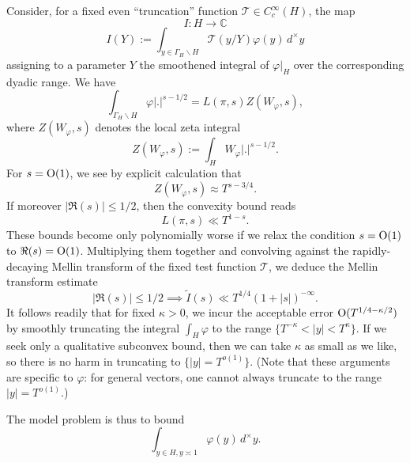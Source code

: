 \documentclass[reqno]{amsart} 
\numberwithin{equation}{section}
\numberwithin{theorem}{section}
\begin{document}
Consider, for a fixed even ``truncation'' function $\mathcal{T} \in C_c^\infty(H)$, the map
\begin{equation*}
  I : H \rightarrow \mathbb{C} 
\end{equation*}
\begin{equation*}
  I(Y) := \int _{y \in \Gamma_{H} \backslash H}  \mathcal{T}(y/Y) \varphi(y) \, d^\times y
\end{equation*}
assigning to a parameter $Y$ the smoothened integral of $\varphi|_H$ over the corresponding dyadic range.  We have
\begin{equation*}
  \int _{\Gamma_{H} \backslash H} \varphi |.|^{s-1/2} = L(\pi,s) Z(W_\varphi,s),
\end{equation*}
where $Z(W_\varphi,s)$ denotes the local zeta integral
\begin{equation*}
  Z(W_\varphi,s) := \int _{H} W_\varphi |.|^{s-1/2}.
\end{equation*}
For $s = \operatorname{O}(1)$, we see by explicit calculation that
\begin{equation*}
  Z(W_\varphi,s) \approx T^{s-3/4}.
\end{equation*}
If moreover $|\Re(s)| \leq 1/2$, then the convexity bound reads
\begin{equation*}
  L(\pi,s) \ll T^{1 - s}.
\end{equation*}
These bounds become only polynomially worse if we relax the condition $s = \operatorname{O}(1)$ to $\Re(s) = \operatorname{O}(1)$.  Multiplying them together and convolving against the rapidly-decaying Mellin transform of the fixed test function $\mathcal{T}$, we deduce the Mellin transform estimate
\begin{equation*}
|\Re(s)| \leq 1/2 \implies \tilde{I}(s) \ll T^{1/4} (1 + |s|)^{-\infty}.
\end{equation*}
It follows readily that for fixed $\kappa > 0$, we incur the acceptable error $\operatorname{O}(T^{1/4 -\kappa/2})$ by smoothly truncating the integral $\int_H \varphi$ to the range $\{T^{-\kappa} < |y| < T^{\kappa}\}$.  If we seek only a qualitative subconvex bound, then we can take $\kappa$ as small as we like, so there is no harm in truncating to $\{ |y| = T^{o(1)} \}$.  (Note that these arguments are specific to $\varphi$: for general vectors, one cannot always truncate to the range $|y| = T^{o(1)}$.)


The model problem is thus to bound
\begin{equation}\label{eq:int-_y-in}
  \int _{y \in H, y \asymp 1} \varphi(y) \, d^\times y.
\end{equation}
\end{document}
